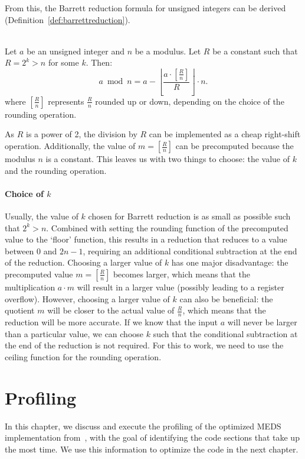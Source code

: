 \documentclass[11pt,a4paper]{report}
\theoremstyle{definition}
\begin{document}
From this, the Barrett reduction formula for unsigned integers can be derived (Definition~\ref{def:barrettreduction}).

\begin{definition}~\\
  \label{def:barrettreduction}
  Let $a$ be an unsigned integer and $n$ be a modulus.
  Let $R$ be a constant such that $R = 2^k > n$ for some $k$. Then:
  \[
    a \bmod n = a - \left\lfloor \frac{a \cdot \left[\frac{R}{n}\right]}{R} \right\rfloor \cdot n.
  \]
  where $\left[\frac{R}{n}\right]$ represents $\frac{R}{n}$ rounded up or down, depending on the choice of the rounding operation.
\end{definition}

As $R$ is a power of 2, the division by $R$ can be implemented as a cheap right-shift operation. Additionally, the value of $m = \left[\frac{R}{n}\right]$ can be precomputed because the modulus $n$ is a constant. This leaves us with two things to choose: the value of $k$ and the rounding operation.

\subsubsection{Choice of $k$}
\label{sec:choiceofk}
Usually, the value of $k$ chosen for Barrett reduction is as small as possible such that $2^k > n$. Combined with setting the rounding function of the precomputed value to the `floor' function, this results in a reduction that reduces to a value between $0$ and $2n-1$, requiring an additional conditional subtraction at the end of the reduction. Choosing a larger value of $k$ has one major disadvantage: the precomputed value $m = \left[\frac{R}{n}\right]$ becomes larger, which means that the multiplication $a \cdot m$ will result in a larger value (possibly leading to a register overflow). However, choosing a larger value of $k$ can also be beneficial: the quotient $m$ will be closer to the actual value of $\frac{R}{n}$, which means that the reduction will be more accurate. If we know that the input $a$ will never be larger than a particular value, we can choose $k$ such that the conditional subtraction at the end of the reduction is not required. For this to work, we need to use the ceiling function for the rounding operation.

\chapter{Profiling}
\label{ch:profiling}
In this chapter, we discuss and execute the profiling of the optimized MEDS implementation from~\cite{chou2024reducing}, with the goal of identifying the code sections that take up the most time. We use this information to optimize the code in the next chapter.
\end{document}
